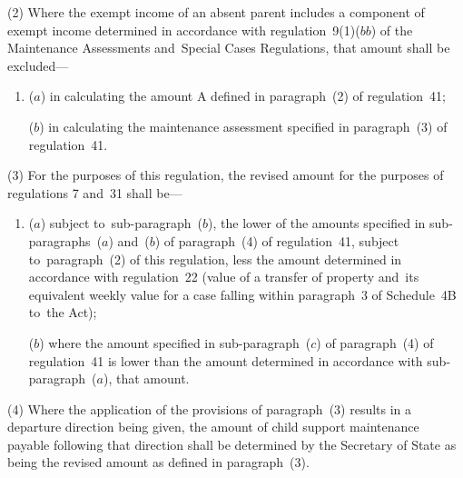 \documentclass[12pt,a4paper]{article}
\begin{document}
(2) Where the exempt income of an absent parent includes a component of exempt
income determined in accordance with regulation~9(1)($bb$) of the Maintenance
Assessments and~Special Cases Regulations, that amount shall be excluded—
\begin{enumerate}\item[]
($a$) in calculating the amount A defined in paragraph~(2) of regulation~41;

($b$) in calculating the maintenance assessment specified in paragraph~(3) of
regulation~41.
\end{enumerate}


(3) For the purposes of this regulation, the revised amount for the purposes of regulations 7 and~31 shall be—
\begin{enumerate}\item[]
($a$) subject to~sub-paragraph~($b$), the lower of the amounts specified in sub-paragraphs~($a$) and~($b$) of paragraph~(4) of regulation~41, subject to~paragraph~(2) of this regulation, less the amount determined in accordance with regulation~22 (value of a transfer of property and~its equivalent weekly value for a case falling within paragraph~3 of Schedule~4B to~the Act);

($b$) where the amount specified in sub-paragraph~($c$) of paragraph~(4) of regulation~41 is lower than the amount determined in accordance with sub-paragraph~($a$), that amount.
\end{enumerate}

(4) Where the application of the provisions of paragraph~(3) results in a departure direction being given, the amount of child support maintenance payable following that direction shall be 
determined by 
  the Secretary of State  %
as being  %
the revised amount as defined in paragraph~(3).

\end{document}

